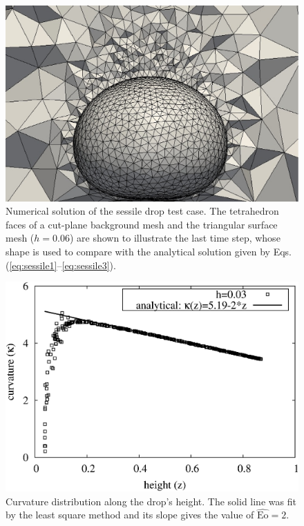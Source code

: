 \documentclass{wccm2014}
\newcommand{\Eo}{\mathrm{Eo}}
\begin{document}
\begin{figure}[ht!]
	\begin{center}
		\includegraphics[angle=0, scale=0.5]{figs/eps/sessileMesh.eps}
	\end{center}
	\caption{Numerical solution of the sessile drop test
	case. The tetrahedron faces of a cut-plane background mesh and the
	triangular surface mesh ($h=0.06$) are shown to illustrate the last
	time step, whose shape is used to compare with the analytical
	solution given by Eqs.(\ref{eq:sessile1}--\ref{eq:sessile3}).}
	\label{fig:sessileMesh} 
\end{figure}

\begin{figure}[ht!]
	\begin{center}
		\includegraphics[angle=0, scale=0.5]{figs/eps/sessileKappa.eps}
	\end{center}
	\caption{Curvature distribution along the drop's height. The solid
	line was fit by the least square method and its slope gives the value 
	of $\hat{\Eo}=2$.}
	\label{fig:sessileKappa} 
\end{figure}
\end{document}
